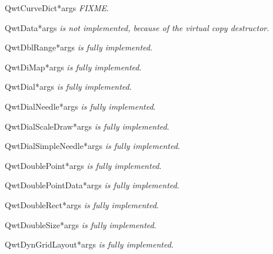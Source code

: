 \documentclass{manual}
\begin{document}
\begin{classdesc}{QwtCurveDict}{*args}
\emph{FIXME}.
\end{classdesc}

\begin{classdesc}{QwtData}{*args}
\emph{is not implemented, because of the virtual copy destructor}.
\end{classdesc}

\begin{classdesc}{QwtDblRange}{*args}
\emph{is fully implemented}.
\end{classdesc}

\begin{classdesc}{QwtDiMap}{*args}
\emph{is fully implemented}.
\end{classdesc}

\begin{classdesc}{QwtDial}{*args}
\emph{is fully implemented}.
\end{classdesc}

\begin{classdesc}{QwtDialNeedle}{*args}
\emph{is fully implemented}.
\end{classdesc}

\begin{classdesc}{QwtDialScaleDraw}{*args}
\emph{is fully implemented}.
\end{classdesc}

\begin{classdesc}{QwtDialSimpleNeedle}{*args}
\emph{is fully implemented}.
\end{classdesc}

\begin{classdesc}{QwtDoublePoint}{*args}
\emph{is fully implemented}.
\end{classdesc}

\begin{classdesc}{QwtDoublePointData}{*args}
\emph{is fully implemented}.
\end{classdesc}

\begin{classdesc}{QwtDoubleRect}{*args}
\emph{is fully implemented}.
\end{classdesc}

\begin{classdesc}{QwtDoubleSize}{*args}
\emph{is fully implemented}.
\end{classdesc}

\begin{classdesc}{QwtDynGridLayout}{*args}
\emph{is fully implemented}.
\end{classdesc}
\end{document}
